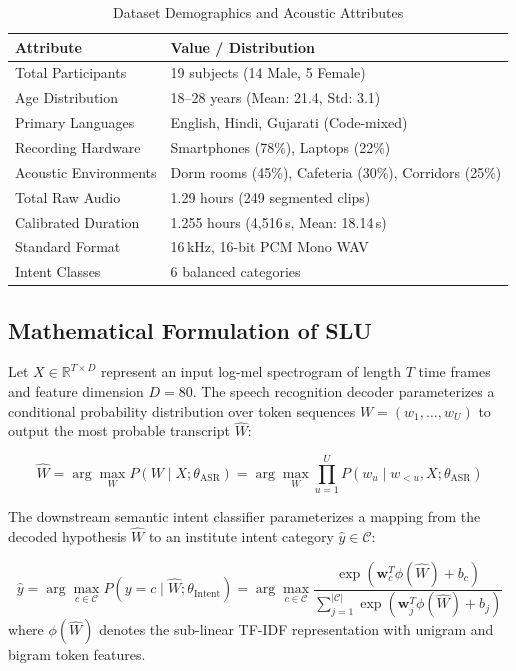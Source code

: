 \documentclass[sigconf,authordraft]{acmart}
\begin{document}
\begin{table}[h]
  \caption{Dataset Demographics and Acoustic Attributes}
  \label{tab:demographics}
  \centering
  \small
  \begin{tabular}{ll}
    \toprule
    \textbf{Attribute} & \textbf{Value / Distribution} \\
    \midrule
    Total Participants & 19 subjects (14 Male, 5 Female) \\
    Age Distribution & 18--28 years (Mean: 21.4, Std: 3.1) \\
    Primary Languages & English, Hindi, Gujarati (Code-mixed) \\
    Recording Hardware & Smartphones (78\%), Laptops (22\%) \\
    Acoustic Environments & Dorm rooms (45\%), Cafeteria (30\%), Corridors (25\%) \\
    Total Raw Audio & 1.29 hours (249 segmented clips) \\
    Calibrated Duration & 1.255 hours (4,516\,s, Mean: 18.14\,s) \\
    Standard Format & 16\,kHz, 16-bit PCM Mono WAV \\
    Intent Classes & 6 balanced categories \\
    \bottomrule
  \end{tabular}
\end{table}

\subsection{Mathematical Formulation of SLU}

Let $X \in \mathbb{R}^{T \times D}$ represent an input log-mel spectrogram of length $T$ time frames
and feature dimension $D = 80$. The speech recognition decoder parameterizes a conditional probability
distribution over token sequences $W = (w_1, \dots, w_U)$ to output the most probable transcript $\hat{W}$:

\begin{equation}
  \hat{W} = \arg\max_{W} P(W \mid X; \theta_{\text{ASR}}) = \arg\max_{W} \prod_{u=1}^U P(w_u \mid w_{<u}, X; \theta_{\text{ASR}})
  \label{eq:asr}
\end{equation}

The downstream semantic intent classifier parameterizes a mapping from the decoded hypothesis $\hat{W}$
to an institute intent category $\hat{y} \in \mathcal{C}$:

\begin{equation}
  \hat{y} = \arg\max_{c \in \mathcal{C}} P(y = c \mid \hat{W}; \theta_{\text{Intent}}) = \arg\max_{c \in \mathcal{C}} \frac{\exp(\mathbf{w}_c^T \phi(\hat{W}) + b_c)}{\sum_{j=1}^{|\mathcal{C}|} \exp(\mathbf{w}_j^T \phi(\hat{W}) + b_j)}
  \label{eq:intent}
\end{equation}
where $\phi(\hat{W})$ denotes the sub-linear TF-IDF representation with unigram and bigram token features.
\end{document}
